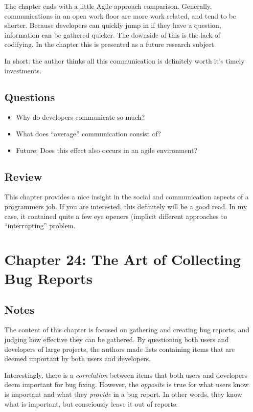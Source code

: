 The chapter ends with a little Agile approach comparison. 
Generally, communications in an open work floor are more work related, and tend to be shorter. 
Because developers can quickly jump in if they have a question, information can be gathered quicker. 
The downside of this is the lack of codifying. 
In the chapter this is presented as a future research subject. 

In short: the author thinks all this communication is definitely worth it's timely investments. 

\subsection{Questions}
\begin{itemize}
  \item Why do developers communicate so much?
  \item What does ``average'' communication consist of?
  \item Future: Does this effect also occurs in an agile environment?
\end{itemize}

\subsection{Review}
This chapter provides a nice insight in the social and communication aspects of a programmers job. 
If you are interested, this definitely will be a good read. 
In my case, it contained quite a few eye openers (implicit different approaches to ``interrupting'' problem. 

\section{Chapter 24: The Art of Collecting Bug Reports}
\subsection{Notes}
The content of this chapter is focused on gathering and creating bug reports, and judging how effective they can be gathered. 
By questioning both users and developers of large projects, the authors made lists containing items that are deemed important by both users and developers. 

Interestingly, there is a \emph{correlation} between items that both users and developers deem important for bug fixing.
However, the \emph{opposite} is true for what users know is important and what they \emph{provide} in a bug report. 
In other words, they know what is important, but consciously leave it out of reports. 


